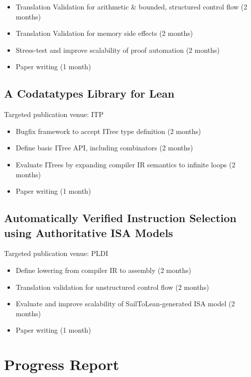 \documentclass[a4paper]{scrartcl}
\begin{document}
\begin{itemize}
\item
  Translation Validation for arithmetic \& bounded, structured control
  flow (2 months)
\item
  Translation Validation for memory side effects (2 months)
\item
  Stress-test and improve scalability of proof automation (2 months)
\item
  Paper writing (1 month)
\end{itemize}

\subsection*{A Codatatypes Library for Lean}\label{a-codatatypes-library-for-lean-1}

Targeted publication venue: ITP

\begin{itemize}
\item
  Bugfix framework to accept ITree type definition (2 months)
\item
  Define basic ITree API, including combinators (2 months)
\item
  Evaluate ITrees by expanding compiler IR semantics to infinite loops
  (2 months)
\item
  Paper writing (1 month)
\end{itemize}

\subsection*{Automatically Verified Instruction Selection using
Authoritative ISA Models}\label{scaling-high-assurance-translation-validation-to-authoritative-isa-models-1}

Targeted publication venue: PLDI

\begin{itemize}
\item
  Define lowering from compiler IR to assembly (2 months)
\item
  Translation validation for unstructured control flow (2 months)
\item
  Evaluate and improve scalability of SailToLean-generated ISA model (2
  months)
\item
  Paper writing (1 month)
\end{itemize}



\section{Progress Report}\label{progress-report}
\end{document}
